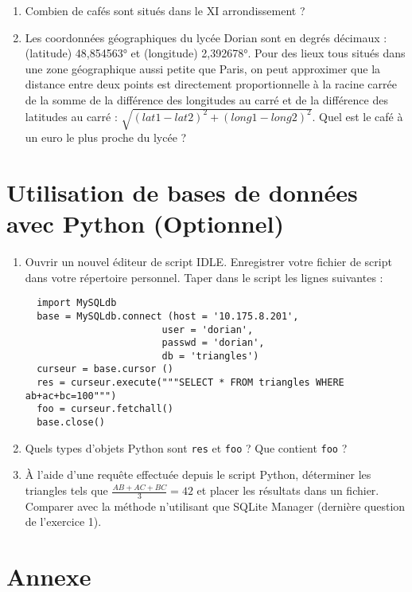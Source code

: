 \begin{enumerate}
 \item Combien de cafés sont situés dans le XI arrondissement ?
 
 \item Les coordonnées géographiques du lycée Dorian sont en degrés décimaux : (latitude) 48,854563° et (longitude) 2,392678°. Pour des lieux tous situés dans une zone géographique aussi petite que Paris, on peut approximer que la distance entre deux points est directement proportionnelle à la racine carrée de la somme de la différence des longitudes au carré et de la différence des latitudes au carré : $\sqrt{(lat1-lat2)^2  + (long1-long2)^2}$. Quel est le café à un euro le plus proche du lycée ?
\end{enumerate}

\section{Utilisation de bases de données avec Python (Optionnel)}

\begin{enumerate}
  \item Ouvrir un nouvel éditeur de script IDLE. Enregistrer votre fichier de script dans votre répertoire personnel. Taper dans le script les lignes suivantes :

  \begin{verbatim}
  import MySQLdb
  base = MySQLdb.connect (host = '10.175.8.201',
                        user = 'dorian',
                        passwd = 'dorian',
                        db = 'triangles')
  curseur = base.cursor ()
  res = curseur.execute("""SELECT * FROM triangles WHERE ab+ac+bc=100""")
  foo = curseur.fetchall()
  base.close()
  \end{verbatim}

  \item Quels types d'objets Python sont \verb|res| et \verb|foo| ? Que contient \verb|foo| ?

  \item À l'aide d'une requête effectuée depuis le script Python, déterminer les triangles tels que $\frac{AB+AC+BC}{3} = 42$ et placer les résultats dans un fichier. Comparer avec la méthode n'utilisant que SQLite Manager (dernière question de l'exercice 1).
\end{enumerate}

\newpage
\section{Annexe}
